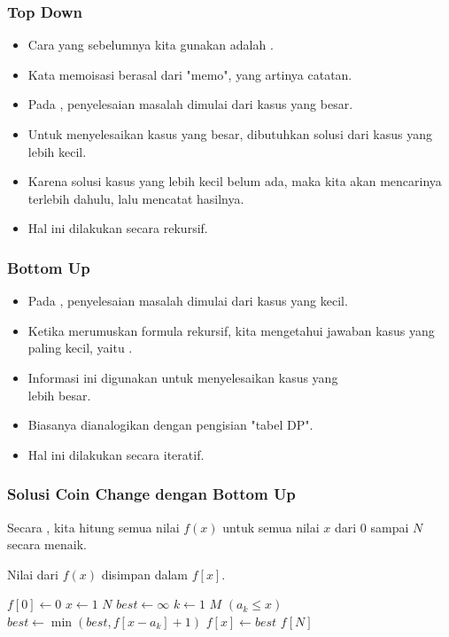 \begin{frame} 
\frametitle{Top Down}
\begin{itemize}
  \item Cara yang sebelumnya kita gunakan adalah \ftopdown.
  \item Kata memoisasi berasal dari "memo", yang artinya catatan.
  \item Pada \ftopdown, penyelesaian masalah dimulai dari kasus yang besar.
  \item Untuk menyelesaikan kasus yang besar, dibutuhkan solusi dari kasus yang lebih kecil.
  \item Karena solusi kasus yang lebih kecil belum ada, maka kita akan mencarinya terlebih dahulu, lalu mencatat hasilnya.
  \item Hal ini dilakukan secara rekursif.
\end{itemize}
\end{frame}

\begin{frame} 
\frametitle{Bottom Up}
\begin{itemize}
  \item Pada \fbottomup, penyelesaian masalah dimulai dari kasus yang kecil.
  \item Ketika merumuskan formula rekursif, kita mengetahui jawaban kasus yang paling kecil, yaitu \fbasecase.
  \item Informasi ini digunakan untuk menyelesaikan kasus yang \\ lebih besar.
  \item Biasanya dianalogikan dengan pengisian "tabel DP".
  \item Hal ini dilakukan secara iteratif.
\end{itemize}
\end{frame}

\begin{frame}
\frametitle{Solusi Coin Change dengan Bottom Up}
Secara \fbottomup, kita hitung semua nilai $f(x)$ untuk \newline semua nilai $x$ dari $0$ sampai $N$ secara menaik.

Nilai dari $f(x)$ disimpan dalam \farray $f[x]$.
\begin{codebox}
\li $f[0] \gets 0$
\li \For $x \gets 1$ \To $N$ \Do
\li   $best \gets \infty$
\li   \For $k \gets 1$ \To $M$ \Do
\li     \If $(a_k \leq x)$ \Then
\li       $best \gets \min(best, f[x - a_k] + 1)$
        \End
      \End
\li   $f[x] \gets best$
    \End
\li \Return $f[N]$
\end{codebox}
\end{frame}

